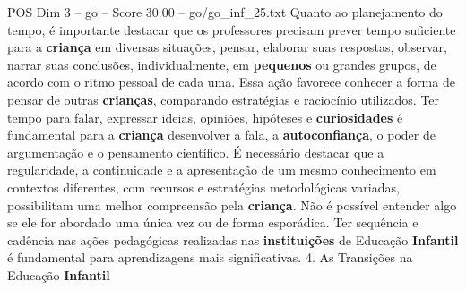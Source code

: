 \begin{textsample}{POS Dim 3 – go – Score 30.00 – go/go\_inf\_25.txt}
Quanto ao planejamento do tempo, é importante destacar que os professores precisam prever tempo suficiente para a \textbf{criança} em diversas situações, pensar, elaborar suas respostas, observar, narrar suas conclusões, individualmente, em \textbf{pequenos} ou grandes grupos, de acordo com o ritmo pessoal de cada uma.
Essa ação favorece conhecer a forma de pensar de outras \textbf{crianças}, comparando estratégias e raciocínio utilizados.
Ter tempo para falar, expressar ideias, opiniões, hipóteses e \textbf{curiosidades} é fundamental para a \textbf{criança} desenvolver a fala, a \textbf{autoconfiança}, o poder de argumentação e o pensamento científico.
É necessário destacar que a regularidade, a continuidade e a apresentação de um mesmo conhecimento em contextos diferentes, com recursos e estratégias metodológicas variadas, possibilitam uma melhor compreensão pela \textbf{criança}.
Não é possível entender algo se ele for abordado uma única vez ou de forma esporádica.
Ter sequência e cadência nas ações pedagógicas realizadas nas \textbf{instituições} de Educação \textbf{Infantil} é fundamental para aprendizagens mais significativas. 4.
As Transições na Educação \textbf{Infantil}

\end{textsample}
